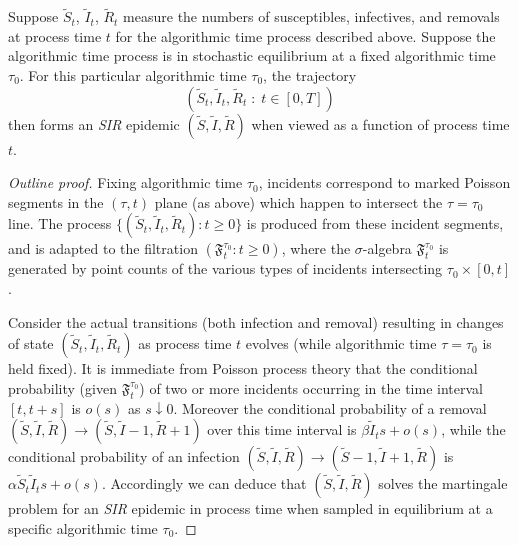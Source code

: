 \documentclass[]{article}
\newcommand{\Filter}{\mathfrak{F}}
\newcommand{\SIR}{\emph{SIR}\xspace}
\begin{document}
 \begin{thm}\label{thm:SIR-epidemic-1}
 Suppose \(\widetilde{S}_t\), \(\widetilde{I}_t\), \(\widetilde{R}_t\) measure the numbers of
 susceptibles, infectives, and removals 
at process time \(t\) for the algorithmic time process described above.
Suppose the algorithmic time process is 
 in stochastic equilibrium
 at a fixed algorithmic time \(\tau_0\).
For this particular algorithmic time \(\tau_0\), the trajectory 
\[
\left(\widetilde{S}_t, \widetilde{I}_t, \widetilde{R}_t\;:\; t\in[0,T]\right)
\]
then forms an \SIR epidemic \((\widetilde{S}, \widetilde{I}, \widetilde{R})\) 
when
 viewed as a function of process time \(t\).
\end{thm}
\begin{proof}[Outline proof]
Fixing algorithmic time \(\tau_0\),
incidents correspond to marked Poisson
segments in the \((\tau,t)\) plane (as above)
which happen to
intersect the \(\tau=\tau_0\) line.
The process \(\{(\widetilde{S}_t, \widetilde{I}_t, \widetilde{R}_t):t\geq0\}\) 
is produced from these incident segments,
and is adapted to the filtration 
\((\Filter_t^{\tau_0}: t\geq0)\),
where the \(\sigma\)-algebra
\(\Filter^{\tau_0}_t\) is generated by point counts of 
the various types of incidents intersecting
\(\tau_0\times[0,t]\).

Consider the actual transitions (both infection
and removal) resulting in changes of state 
\((\widetilde{S}_t, \widetilde{I}_t, \widetilde{R}_t)\)
as process time \(t\) evolves (while algorithmic time \(\tau=\tau_0\) 
is held fixed).
It is immediate from Poisson process theory
that the conditional probability
(given \(\Filter^{\tau_0}_t\))
of two or more incidents
occurring in the time interval \([t,t+s]\)
is \(o(s)\) as \(s\downarrow0\).
Moreover the conditional probability of
a removal \((\widetilde{S}, \widetilde{I}, \widetilde{R})\to(\widetilde{S}, \widetilde{I}-1, \widetilde{R}+1)\)
over this time interval is 
\(\beta\widetilde{I}_t s+o(s)\),
while the conditional probability of an infection
\((\widetilde{S}, \widetilde{I}, \widetilde{R})\to(\widetilde{S}-1, \widetilde{I}+1, \widetilde{R})\)
is 
\(\alpha\widetilde{S}_t \widetilde{I}_t s+o(s)\).
Accordingly we can deduce that
\((\widetilde{S}, \widetilde{I}, \widetilde{R})\)
solves the martingale problem \citep{StroockVaradhan-1979}
for an \SIR epidemic
in process time when sampled in equilibrium 
at a specific algorithmic time \(\tau_0\).
\end{proof}
\end{document}
